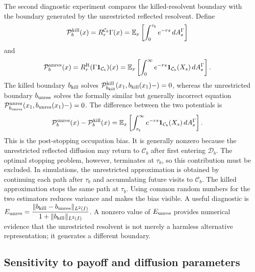 \documentclass[pdflatex,sn-mathphys-num]{sn-jnl}
\theoremstyle{plain}
\theoremstyle{definition}
\theoremstyle{remark}
\numberwithin{equation}{section}
\begin{document}
The second diagnostic experiment compares the killed-resolvent boundary with the boundary generated by the unrestricted reflected resolvent. Define 
\[ 
\mathcal P_b^{\rm kill}(x) = R_r^{\mathcal C_b}\Gamma(x) = \mathbb E_x \left[ \int_0^{\tau_b}e^{-rs}\,dA_s^\Gamma \right] 
\] 
and 
\[ 
\mathcal P_b^{\rm unres}(x) = R_r^{\mathrm R}(\Gamma\mathbf 1_{\mathcal C_b})(x) = \mathbb E_x \left[ \int_0^\infty e^{-rs}\mathbf 1_{\mathcal C_b}(X_s)\,dA_s^\Gamma \right]. 
\] 
The killed boundary \(b_{\rm kill}\) solves 
$\mathcal P_{b_{\rm kill}}^{\rm kill}(x_1,b_{\rm kill}(x_1)-)=0$, 
whereas the unrestricted boundary \(b_{\rm unres}\) solves the formally similar but generally incorrect equation 
$\mathcal P_{b_{\rm unres}}^{\rm unres} (x_1,b_{\rm unres}(x_1)-)=0 $. 
The difference between the two potentials is 
\begin{align} \label{eq:post-stopping-bias} 
\mathcal P_b^{\rm unres}(x)-\mathcal P_b^{\rm kill}(x) = \mathbb E_x \left[ \int_{\tau_b}^{\infty} e^{-rs}\mathbf 1_{\mathcal C_b}(X_s)\,dA_s^\Gamma \right]. 
\end{align} 
This is the post-stopping occupation bias. It is generally nonzero because the unrestricted reflected diffusion may return to \(\mathcal C_b\) after first entering \(\mathcal D_b\). The optimal stopping problem, however, terminates at \(\tau_b\), so this contribution must be excluded. In simulations, the unrestricted approximation is obtained by continuing each path after \(\tau_b\) and accumulating future visits to \(\mathcal C_b\). The killed approximation stops the same path at \(\tau_b\). Using common random numbers for the two estimators reduces variance and makes the bias visible. A useful diagnostic is 
$\displaystyle E_{\rm unres} = \frac{ \|b_{\rm kill}-b_{\rm unres}\|_{L^2(I)} }{ 1+\|b_{\rm kill}\|_{L^2(I)} } $. 
A nonzero value of \(E_{\rm unres}\) provides numerical evidence that the unrestricted resolvent is not merely a harmless alternative representation; it generates a different boundary. 

\subsection{Sensitivity to payoff and diffusion parameters} \label{subsec:parameter-sensitivity} 
\end{document}
